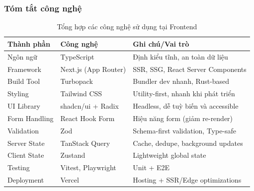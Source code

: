 \subsubsection{Tóm tắt công nghệ}
\begin{table}[H]
\centering
\caption{Tổng hợp các công nghệ sử dụng tại Frontend}
\label{tab:frontend_tech}
\begin{tabular}{|l|l|l|}
\hline
\textbf{Thành phần} & \textbf{Công nghệ} & \textbf{Ghi chú/Vai trò} \\ \hline
Ngôn ngữ & TypeScript & Định kiểu tĩnh, an toàn dữ liệu \\ \hline
Framework & Next.js (App Router) & SSR, SSG, React Server Components \\ \hline
Build Tool & Turbopack & Bundler dev nhanh, Rust-based \\ \hline
Styling & Tailwind CSS & Utility-first, nhanh khi phát triển \\ \hline
UI Library & shadcn/ui + Radix & Headless, dễ tuỳ biến và accessible \\ \hline
Form Handling & React Hook Form & Hiệu năng form (giảm re-render) \\ \hline
Validation & Zod & Schema-first validation, Type-safe \\ \hline
Server State & TanStack Query & Cache, dedupe, background updates \\ \hline
Client State & Zustand & Lightweight global state \\ \hline
Testing & Vitest, Playwright & Unit + E2E \\ \hline
Deployment & Vercel & Hosting + SSR/Edge optimizations \\ \hline
\end{tabular}
\end{table}
